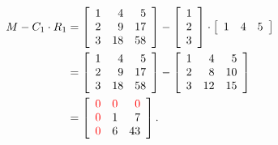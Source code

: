 \begin{align*} 
M - C_1 \cdot R_1 &= \left[\begin{array}{rrr} 
    1   &  4   &  5 \\
     2  &   9  &  17 \\
     3  &  18  &  58 \end{array}  \right] -  \left[\begin{array}{r} 
    1  \\ 2 \\ 3  \end{array}  \right] \cdot \left[\begin{array}{rrr} 
    1   &  4   &  5 \end{array}  \right] \\
    &=  \left[\begin{array}{rrr} 
    1   &  4   &  5 \\
     2  &   9  &  17 \\
     3  &  18  &  58 \end{array}  \right] - 
     \left[\begin{array}{rrr} 
    1   &  4   &  5 \\
     2  &   8  &  10 \\
     3  &  12  &  15 \end{array}  \right]\\
     &=\left[\begin{array}{rrr} 
      \color{red} 0  &    \color{red} 0  &   \color{red}  0 \\
      \color{red}  0   &  1   &  7 \\
     \color{red}   0   &  6   & 43 \end{array}  \right].
\end{align*}

